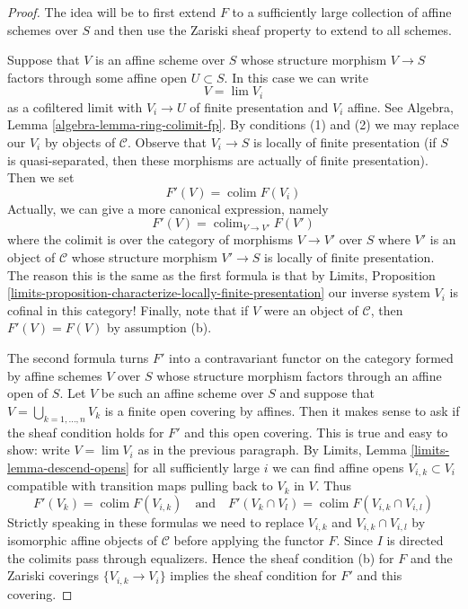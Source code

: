 \documentclass{stacks-project}
\theoremstyle{plain}
\theoremstyle{definition}
\theoremstyle{remark}
\numberwithin{equation}{subsection}
\def\lim{\mathop{\mathrm{lim}}\nolimits}
\def\colim{\mathop{\mathrm{colim}}\nolimits}
\begin{document}
\begin{proof}
The idea will be to first extend $F$ to a sufficiently large collection of
affine schemes over $S$ and then use the Zariski sheaf property to extend
to all schemes.

\medskip\noindent
Suppose that $V$ is an affine scheme over $S$ whose structure morphism
$V \to S$ factors through some affine open $U \subset S$. In this case
we can write
$$
V = \lim V_i
$$
as a cofiltered limit with $V_i \to U$ of finite presentation
and $V_i$ affine. See Algebra, Lemma \ref{algebra-lemma-ring-colimit-fp}.
By conditions (1) and (2)
we may replace our $V_i$ by objects of $\mathcal{C}$.
Observe that $V_i \to S$ is locally of finite presentation
(if $S$ is quasi-separated, then these morphisms are actually
of finite presentation). Then we set
$$
F'(V) = \colim F(V_i)
$$
Actually, we can give a more canonical expression, namely
$$
F'(V) = \colim_{V \to V'} F(V')
$$
where the colimit is over the category of morphisms $V \to V'$ over $S$
where $V'$ is an object of $\mathcal{C}$ whose structure
morphism $V' \to S$ is locally of finite presentation.
The reason this is the same as the first formula is that by
Limits, Proposition
\ref{limits-proposition-characterize-locally-finite-presentation}
our inverse system $V_i$ is cofinal in this category!
Finally, note that if $V$ were an object of $\mathcal{C}$,
then $F'(V) = F(V)$ by assumption (b).

\medskip\noindent
The second formula turns $F'$ into a contravariant functor
on the category formed by affine schemes $V$ over $S$ whose
structure morphism factors through an affine open of $S$.
Let $V$ be such an affine scheme over $S$ and
suppose that $V = \bigcup_{k = 1, \ldots, n} V_k$ is a finite open covering
by affines. Then it makes sense to ask if the sheaf condition
holds for $F'$ and this open covering.
This is true and easy to show: write $V = \lim V_i$ as in
the previous paragraph. By Limits, Lemma \ref{limits-lemma-descend-opens}
for all sufficiently large $i$ we can find affine opens
$V_{i, k} \subset V_i$ compatible with transition maps
pulling back to $V_k$ in $V$. Thus
$$
F'(V_k) = \colim F(V_{i, k})
\quad\text{and}\quad
F'(V_k \cap V_l) = \colim F(V_{i, k} \cap V_{i, l})
$$
Strictly speaking in these formulas we need to replace $V_{i, k}$ and
$V_{i, k} \cap V_{i, l}$ by isomorphic affine objects of $\mathcal{C}$
before applying the functor $F$.
Since $I$ is directed the colimits pass through equalizers.
Hence the sheaf condition (b) for $F$ and the Zariski coverings
$\{V_{i, k} \to V_i\}$ implies the sheaf
condition for $F'$ and this covering.


\end{proof}
\end{document}
